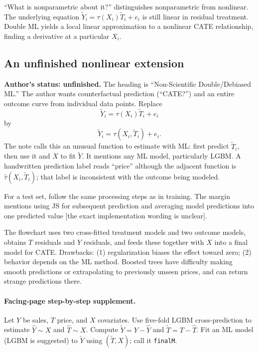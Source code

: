 ``What is nonparametric about it?'' distinguishes nonparametric from nonlinear. The underlying equation $\widetilde Y_i=\tau(X_i)\widetilde T_i+e_i$ is still linear in residual treatment. Double ML yields a local linear approximation to a nonlinear CATE relationship, finding a derivative at a particular $X_i$.

\subsection{An unfinished nonlinear extension}
\textbf{Author's status: unfinished.} The heading is ``Non-Scientific Double/Debiased ML.'' The author wants counterfactual prediction (``CATE?'') and an entire outcome curve from individual data points. Replace
\[\widetilde Y_i=\tau(X_i)\widetilde T_i+e_i\]
by
\[\widetilde Y_i=\tau(X_i,\widetilde T_i)+e_i.\]
The note calls this an unusual function to estimate with ML: first predict $\widetilde T_i$, then use it and $X$ to fit $\widetilde Y$. It mentions any ML model, particularly LGBM. A handwritten prediction label reads ``price'' although the adjacent function is $\hat\tau(X_i,\widetilde T_i)$; that label is inconsistent with the outcome being modeled.

For a test set, follow the same processing steps as in training. The margin mentions using JS for subsequent prediction and averaging model predictions into one predicted value [the exact implementation wording is unclear].

The flowchart uses two cross-fitted treatment models and two outcome models, obtains $T$ residuals and $Y$ residuals, and feeds these together with $X$ into a final model for CATE. Drawbacks: (1) regularization biases the effect toward zero; (2) behavior depends on the ML method. Boosted trees have difficulty making smooth predictions or extrapolating to previously unseen prices, and can return strange predictions there.

\paragraph{Facing-page step-by-step supplement.}
Let $Y$ be sales, $T$ price, and $X$ covariates. Use five-fold LGBM cross-prediction to estimate $\hat Y\sim X$ and $\hat T\sim X$. Compute $\widetilde Y=Y-\hat Y$ and $\widetilde T=T-\hat T$. Fit an ML model (LGBM is suggested) to $\widetilde Y$ using $(\widetilde T,X)$; call it \texttt{finalM}.

